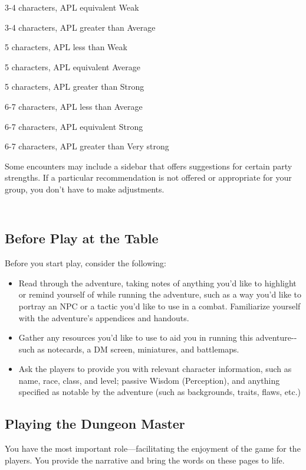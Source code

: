 3-4 characters, APL equivalent Weak

3-4 characters, APL greater than Average

5 characters, APL less than Weak

5 characters, APL equivalent Average

5 characters, APL greater than Strong

6-7 characters, APL less than Average

6-7 characters, APL equivalent Strong

6-7 characters, APL greater than Very strong

Some encounters may include a sidebar that offers suggestions for
certain party strengths. If a particular recommendation is not offered
or appropriate for your group, you don't have to make adjustments.

\subsection{\texorpdfstring{\\
Before Play at the
Table}{ Before Play at the Table}}\label{before-play-at-the-table}

Before you start play, consider the following:

\begin{itemize}
\item
  Read through the adventure, taking notes of anything you'd like to
  highlight or remind yourself of while running the adventure, such as a
  way you'd like to portray an NPC or a tactic you'd like to use in a
  combat. Familiarize yourself with the adventure's appendices and
  handouts.
\item
  Gather any resources you'd like to use to aid you in running this
  adventure-\/-such as notecards, a DM screen, miniatures, and
  battlemaps.
\item
  Ask the players to provide you with relevant character information,
  such as name, race, class, and level; passive Wisdom (Perception), and
  anything specified as notable by the adventure (such as backgrounds,
  traits, flaws, etc.)
\end{itemize}

\subsection{Playing the Dungeon
Master}\label{playing-the-dungeon-master}

You have the most important role---facilitating the enjoyment of the
game for the players. You provide the narrative and bring the words on
these pages to life.

